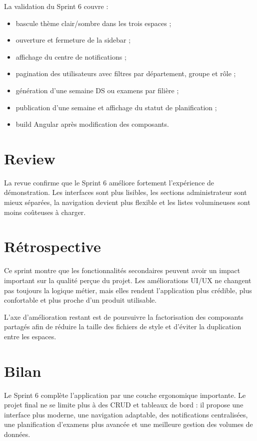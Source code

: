 \documentclass[12pt,a4paper]{report}
\begin{document}
La validation du Sprint 6 couvre :

\begin{itemize}[itemsep=0.4em]
    \item bascule thème clair/sombre dans les trois espaces ;
    \item ouverture et fermeture de la sidebar ;
    \item affichage du centre de notifications ;
    \item pagination des utilisateurs avec filtres par département, groupe et rôle ;
    \item génération d'une semaine DS ou examens par filière ;
    \item publication d'une semaine et affichage du statut de planification ;
    \item build Angular après modification des composants.
\end{itemize}

\section{Review}

La revue confirme que le Sprint 6 améliore fortement l'expérience de démonstration. Les interfaces sont plus lisibles, les sections administrateur sont mieux séparées, la navigation devient plus flexible et les listes volumineuses sont moins coûteuses à charger.

\section{Rétrospective}

Ce sprint montre que les fonctionnalités secondaires peuvent avoir un impact important sur la qualité perçue du projet. Les améliorations UI/UX ne changent pas toujours la logique métier, mais elles rendent l'application plus crédible, plus confortable et plus proche d'un produit utilisable.

L'axe d'amélioration restant est de poursuivre la factorisation des composants partagés afin de réduire la taille des fichiers de style et d'éviter la duplication entre les espaces.

\section{Bilan}

Le Sprint 6 complète l'application par une couche ergonomique importante. Le projet final ne se limite plus à des CRUD et tableaux de bord : il propose une interface plus moderne, une navigation adaptable, des notifications centralisées, une planification d'examens plus avancée et une meilleure gestion des volumes de données.
\end{document}
